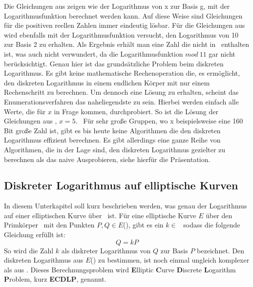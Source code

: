 		\wupp Die Gleichungen aus  zeigen wie der Logarithmus von x zur Basis g, mit der Logarithmusfunktion berechnet werden kann. Auf diese Weise sind Gleichungen für die positiven reellen Zahlen  immer eindeutig lösbar. Für die Gleichungen aus  wird ebenfalls mit der Logarithmusfunktion versucht, den Logarithmus von 10 zur Basis 2 zu erhalten. Als Ergebnis erhält man eine Zahl die nicht in \myZPStern~enthalten ist, was auch nicht verwundert, da die Logarithmusfunktion $mod~11$ gar nicht berücksichtigt. Genau hier ist das grundsätzliche Problem beim diskreten Logarithmus. Es gibt keine mathematische Rechenoperation die, es ermöglicht, den diskreten Logarithmus in einem endlichen Körper mit nur einem Rechenschritt zu berechnen. Um dennoch eine Lösung zu erhalten, scheint das Enumerationsverfahren das naheliegendste zu sein. Hierbei werden einfach alle Werte, die für $x$ in Frage kommen, durchprobiert. So ist die Lösung der Gleichungen aus , $x = 5$.~\cite{DLP:ECDLP:Probleme:und:Loesungen} Für sehr große Gruppen, wo x beispielsweise eine 160 Bit große Zahl ist, gibt es bis heute keine Algorithmen die den diskreten Logarithmus effizient berechnen.\cite{Kryptografie:in:Theorie:und:Praxis} Es gibt allerdings eine ganze Reihe von Algorithmen, die in der Lage sind, den diskreten Logarithmus gezielter zu berechnen als das naive Ausprobieren, siehe hierfür die Präsentation.
		
		
		\subsection*{Diskreter Logarithmus auf elliptische Kurven}
			In diesem Unterkapitel soll kurz beschrieben werden, was genau der Logarithmus auf einer elliptischen Kurve über \myZPStern~ist. Für eine elliptische Kurve $E$ über den Primkörper \myZPStern~mit den Punkten $P, Q \in E$(\myZPStern), gibt es ein $k \in$ \myZPStern~sodass die folgende Gleichung erfüllt ist:
			\begin{displaymath}
				Q = kP
			\end{displaymath}
			So wird die Zahl $k$ als diskreter Logarithmus von $Q$ zur Basis $P$ bezeichnet. Den diskreten Logarithmus aus $E$(\myZPStern) zu bestimmen, ist noch einmal ungleich komplexer als aus \myZPStern. Dieses Berechnungsproblem wird \textbf{E}lliptic \textbf{C}urve \textbf{D}iscrete \textbf{L}ogarithm \textbf{P}roblem, kurz \textbf{ECDLP}, genannt.